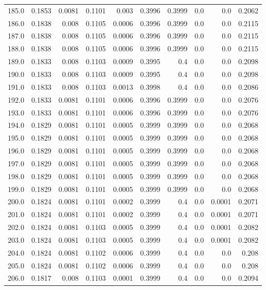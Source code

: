 \begin{longtable}{lrrrrrrrrr}
185.0 & 0.1853 & 0.0081 & 0.1101 & 0.003 & 0.3996 & 0.3999 & 0.0 & 0.0 & 0.2062 \\
186.0 & 0.1838 & 0.008 & 0.1105 & 0.0006 & 0.3996 & 0.3999 & 0.0 & 0.0 & 0.2115 \\
187.0 & 0.1838 & 0.008 & 0.1105 & 0.0006 & 0.3996 & 0.3999 & 0.0 & 0.0 & 0.2115 \\
188.0 & 0.1838 & 0.008 & 0.1105 & 0.0006 & 0.3996 & 0.3999 & 0.0 & 0.0 & 0.2115 \\
189.0 & 0.1833 & 0.008 & 0.1103 & 0.0009 & 0.3995 & 0.4 & 0.0 & 0.0 & 0.2098 \\
190.0 & 0.1833 & 0.008 & 0.1103 & 0.0009 & 0.3995 & 0.4 & 0.0 & 0.0 & 0.2098 \\
191.0 & 0.1833 & 0.008 & 0.1103 & 0.0013 & 0.3998 & 0.4 & 0.0 & 0.0 & 0.2086 \\
192.0 & 0.1833 & 0.0081 & 0.1101 & 0.0006 & 0.3996 & 0.3999 & 0.0 & 0.0 & 0.2076 \\
193.0 & 0.1833 & 0.0081 & 0.1101 & 0.0006 & 0.3996 & 0.3999 & 0.0 & 0.0 & 0.2076 \\
194.0 & 0.1829 & 0.0081 & 0.1101 & 0.0005 & 0.3999 & 0.3999 & 0.0 & 0.0 & 0.2068 \\
195.0 & 0.1829 & 0.0081 & 0.1101 & 0.0005 & 0.3999 & 0.3999 & 0.0 & 0.0 & 0.2068 \\
196.0 & 0.1829 & 0.0081 & 0.1101 & 0.0005 & 0.3999 & 0.3999 & 0.0 & 0.0 & 0.2068 \\
197.0 & 0.1829 & 0.0081 & 0.1101 & 0.0005 & 0.3999 & 0.3999 & 0.0 & 0.0 & 0.2068 \\
198.0 & 0.1829 & 0.0081 & 0.1101 & 0.0005 & 0.3999 & 0.3999 & 0.0 & 0.0 & 0.2068 \\
199.0 & 0.1829 & 0.0081 & 0.1101 & 0.0005 & 0.3999 & 0.3999 & 0.0 & 0.0 & 0.2068 \\
200.0 & 0.1824 & 0.0081 & 0.1101 & 0.0002 & 0.3999 & 0.4 & 0.0 & 0.0001 & 0.2071 \\
201.0 & 0.1824 & 0.0081 & 0.1101 & 0.0002 & 0.3999 & 0.4 & 0.0 & 0.0001 & 0.2071 \\
202.0 & 0.1824 & 0.0081 & 0.1103 & 0.0005 & 0.3999 & 0.4 & 0.0 & 0.0001 & 0.2082 \\
203.0 & 0.1824 & 0.0081 & 0.1103 & 0.0005 & 0.3999 & 0.4 & 0.0 & 0.0001 & 0.2082 \\
204.0 & 0.1824 & 0.0081 & 0.1102 & 0.0006 & 0.3999 & 0.4 & 0.0 & 0.0 & 0.208 \\
205.0 & 0.1824 & 0.0081 & 0.1102 & 0.0006 & 0.3999 & 0.4 & 0.0 & 0.0 & 0.208 \\
206.0 & 0.1817 & 0.008 & 0.1103 & 0.0001 & 0.3999 & 0.4 & 0.0 & 0.0 & 0.2094 \\

\end{longtable}
